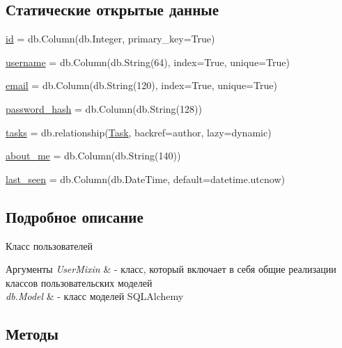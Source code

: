 \subsection*{Статические открытые данные}
\begin{DoxyCompactItemize}
\item 
\mbox{\hyperlink{classapp_1_1models_1_1_user_ad28c4b49ed1a0a093e086410d9da2df2}{id}} = db.\+Column(db.\+Integer, primary\+\_\+key=True)
\item 
\mbox{\hyperlink{classapp_1_1models_1_1_user_aec05013ad6d15a43fcd996241fc32912}{username}} = db.\+Column(db.\+String(64), index=True, unique=True)
\item 
\mbox{\hyperlink{classapp_1_1models_1_1_user_abede62bbd3c533d9532f44a7181bb970}{email}} = db.\+Column(db.\+String(120), index=True, unique=True)
\item 
\mbox{\hyperlink{classapp_1_1models_1_1_user_a80ee86a4974fc0e6ae597288d2e2fe43}{password\+\_\+hash}} = db.\+Column(db.\+String(128))
\item 
\mbox{\hyperlink{classapp_1_1models_1_1_user_a9d486736caa6cb4e1878bf6ec022ba36}{tasks}} = db.\+relationship(\textquotesingle{}\mbox{\hyperlink{classapp_1_1models_1_1_task}{Task}}\textquotesingle{}, backref=\textquotesingle{}author\textquotesingle{}, lazy=\textquotesingle{}dynamic\textquotesingle{})
\item 
\mbox{\hyperlink{classapp_1_1models_1_1_user_ae73eebfaf616e6c86471d14b89f18a85}{about\+\_\+me}} = db.\+Column(db.\+String(140))
\item 
\mbox{\hyperlink{classapp_1_1models_1_1_user_a9b0d23d616421ef30c01e87bb92f6aea}{last\+\_\+seen}} = db.\+Column(db.\+Date\+Time, default=datetime.\+utcnow)
\end{DoxyCompactItemize}


\subsection{Подробное описание}
Класс пользователей 


\begin{DoxyParams}{Аргументы}
{\em User\+Mixin} & -\/ класс, который включает в себя общие реализации классов пользовательских моделей \\
\hline
{\em db.\+Model} & -\/ класс моделей S\+Q\+L\+Alchemy \\
\hline
\end{DoxyParams}


\subsection{Методы}
\mbox{\label{classapp_1_1models_1_1_user_a7569b5686d9aa38eb081b4d811338d9f}} 
